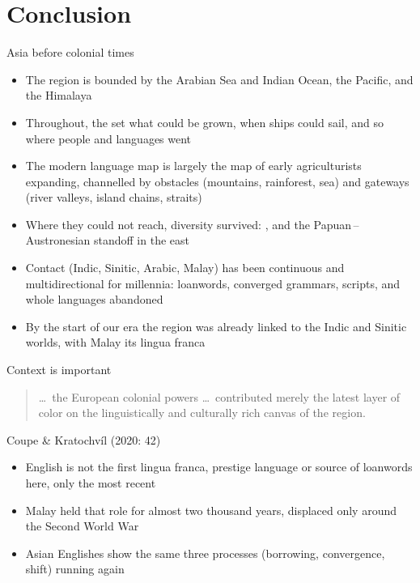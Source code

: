 \documentclass{beamer}
\begin{document}
\section{Conclusion}

\begin{frame}{Asia before colonial times}
  \begin{itemize}
  \item The region is bounded by the Arabian Sea and Indian Ocean, the Pacific,
    and the Himalaya
  \item Throughout, the  set what could be grown, when ships
    could sail, and so where people and languages went
  \item The modern language map is largely the map of early agriculturists
    expanding, channelled by obstacles (mountains, rainforest, sea) and
    gateways (river valleys, island chains, straits)
  \item Where they could not reach, diversity survived: , and the
    Papuan\,--\,Austronesian standoff in the east
  \item Contact (Indic, Sinitic, Arabic, Malay) has been continuous and
    multidirectional for millennia: loanwords, converged grammars, scripts,
    and whole languages abandoned
  \item By the start of our era the region was already linked to the Indic and
    Sinitic worlds, with Malay its lingua franca
  \end{itemize}
\end{frame}

\begin{frame}{Context is important}
  \begin{quote}
    \ldots\ the European colonial powers \ldots\ contributed merely the latest
    layer of color on the linguistically and culturally rich canvas of the
    region.
  \end{quote}
  \begin{flushright}
    Coupe \& Kratochvíl (2020: 42)
  \end{flushright}
  \begin{itemize}
  \item English is not the first lingua franca, prestige language or source
    of loanwords here, only the most recent
  \item Malay held that role for almost two thousand years, displaced only
    around the Second World War
  \item Asian Englishes show the same three processes (borrowing,
    convergence, shift) running again
  \end{itemize}
\end{frame}
\end{document}
